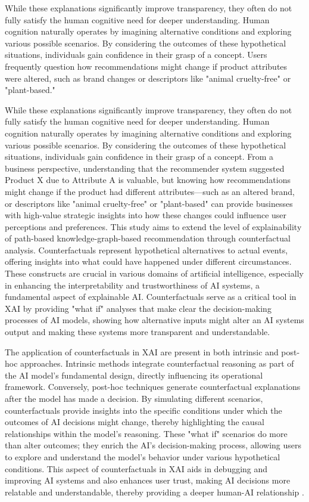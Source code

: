 While these explanations significantly improve transparency, they often do not fully
satisfy the human cognitive need for deeper understanding. Human cognition
naturally operates by imagining alternative conditions and exploring various
possible scenarios. By considering the outcomes of these hypothetical situations,
individuals gain confidence in their grasp of a concept. Users frequently question
how recommendations might change if product attributes were altered, such as
brand changes or descriptors like "animal cruelty-free" or "plant-based."

While these explanations significantly improve transparency, they often do not fully
satisfy the human cognitive need for deeper understanding. Human cognition
naturally operates by imagining alternative conditions and exploring various
possible scenarios. By considering the outcomes of these hypothetical situations,
individuals gain confidence in their grasp of a concept. From a business perspective,
understanding that the recommender system suggested Product X due to Attribute A
is valuable, but knowing how recommendations might change if the product had different
attributes—such as an altered brand, or descriptors like "animal cruelty-free"
or "plant-based" can provide businesses with high-value strategic insights into how
these changes could influence user perceptions and preferences.
This study aims to extend the level of explainability of path-based knowledge-graph-based
recommendation through counterfactual analysis. Counterfactuals represent hypothetical
alternatives to actual events, offering insights into what could have happened
under different circumstances. These constructs are crucial in various domains of
artificial intelligence, especially in enhancing the interpretability and
trustworthiness of AI systems, a fundamental aspect of explainable AI. Counterfactuals
serve as a critical tool in XAI by providing "what if" analyses that make clear the
decision-making processes of AI models, showing how alternative inputs might
alter an AI systems output and making these systems more transparent and
understandable.

The application of counterfactuals in XAI are present in both intrinsic and post-hoc
approaches. Intrinsic methods integrate counterfactual reasoning as part of the AI
model's fundamental design, directly influencing its operational framework. Conversely,
post-hoc techniques generate counterfactual explanations after the model has
made a decision. By simulating different scenarios, counterfactuals provide
insights into the specific conditions under which the outcomes of AI decisions
might change, thereby highlighting the causal relationships within the model's reasoning.
These "what if" scenarios do more than alter outcomes; they enrich the AI's decision-making
process, allowing users to explore and understand the model's behavior under
various hypothetical conditions. This aspect of counterfactuals in XAI aids in debugging
and improving AI systems and also enhances user trust, making AI decisions more
relatable and understandable, thereby providing a deeper human-AI relationship \parencite{byrne_counterfactuals_2019}.

